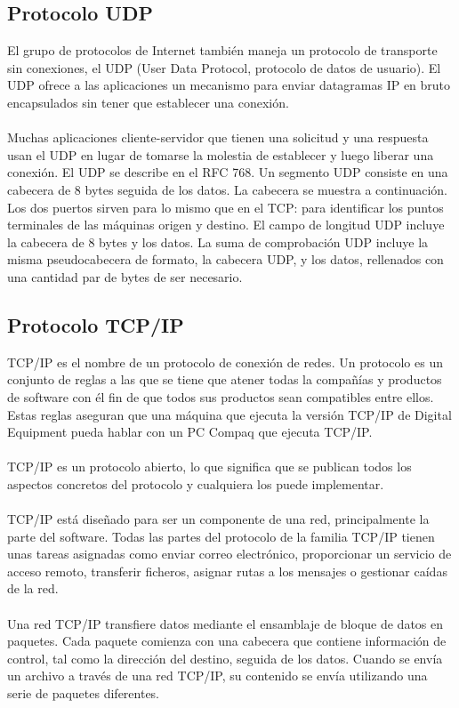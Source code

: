 \documentclass[12pt,letterpaper]{article}
\begin{document}
\subsection{Protocolo UDP}
El grupo de protocolos de Internet también maneja un protocolo de transporte sin conexiones, 
el UDP (User Data Protocol, protocolo de datos de usuario). El UDP ofrece a las aplicaciones 
un mecanismo para enviar datagramas IP en bruto encapsulados sin tener que establecer una 
conexión.
\\ \\
Muchas aplicaciones cliente-servidor que tienen una solicitud y una respuesta usan el UDP en 
lugar de tomarse la molestia de establecer y luego liberar una conexión. El UDP se describe 
en el RFC 768. Un segmento UDP consiste en una cabecera de 8 bytes seguida de los datos. La 
cabecera se muestra a continuación. Los dos puertos sirven para lo mismo que en el TCP: para 
identificar los puntos terminales de las máquinas origen y destino. El campo de longitud UDP 
incluye la cabecera de 8 bytes y los datos. La suma de comprobación UDP incluye la misma 
pseudocabecera de formato, la cabecera UDP, y los datos, rellenados con una cantidad par 
de bytes de ser necesario.

\subsection{Protocolo TCP/IP}
TCP/IP es el nombre de un protocolo de conexión de redes. Un protocolo es un conjunto de 
reglas a las que se tiene que atener todas la compañías y productos de software con él fin 
de que todos sus productos sean compatibles entre ellos. Estas reglas aseguran que una 
máquina que ejecuta la versión TCP/IP de Digital Equipment pueda hablar con un PC Compaq 
que ejecuta TCP/IP.
\\ \\
TCP/IP es un protocolo abierto, lo que significa que se publican todos los aspectos concretos 
del protocolo y cualquiera los puede implementar.
\\ \\
TCP/IP está diseñado para ser un componente de una red, principalmente la parte del software. 
Todas las partes del protocolo de la familia TCP/IP tienen unas tareas asignadas como enviar 
correo electrónico, proporcionar un servicio de acceso remoto, transferir ficheros, asignar 
rutas a los mensajes o gestionar caídas de la red.
\\ \\
Una red TCP/IP transfiere datos mediante el ensamblaje de bloque de datos en paquetes. Cada 
paquete comienza con una cabecera que contiene información de control, tal como la dirección 
del destino, seguida de los datos. Cuando se envía un archivo a través de una red TCP/IP, 
su contenido se envía utilizando una serie de paquetes diferentes.
\end{document}
